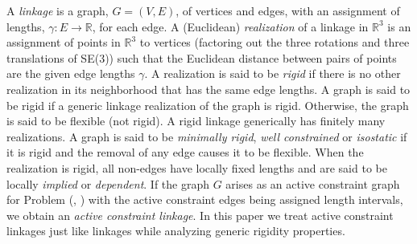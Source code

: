 A \emph{linkage} is a graph, $G = (V, E)$, of vertices and edges, with an
assignment of lengths, $\gamma: E \rightarrow \mathbb{R}$, for each edge. A
(Euclidean) \emph{realization} of a linkage in $\mathbb{R}^3$ is an assignment
of points in $\mathbb{R}^3$ to vertices (factoring out the three rotations and
three translations of SE(3)) such that the Euclidean distance between pairs of
points are the given edge lengths $\gamma$. A realization is said to be
\emph{rigid} if there is no other realization in its neighborhood that has the
same edge lengths. A graph is said to be rigid if a generic linkage realization
of the graph is rigid. Otherwise, the graph is said to be flexible (not rigid).
A rigid linkage generically has finitely many realizations. A graph is said to
be \emph{minimally rigid}, \emph{well constrained} or \emph{isostatic} if it is
rigid and the removal of any edge causes it to be flexible. When the
realization is rigid, all non-edges have locally fixed lengths and are said to
be locally \emph{implied} or \emph{dependent}.  If the graph $G$ arises as an
active constraint graph for Problem (\cone, \ctwo) with the active constraint
edges being assigned length intervals, we obtain an \emph{active constraint
linkage}. In this paper we treat active constraint linkages just like linkages
while analyzing generic rigidity properties. 




